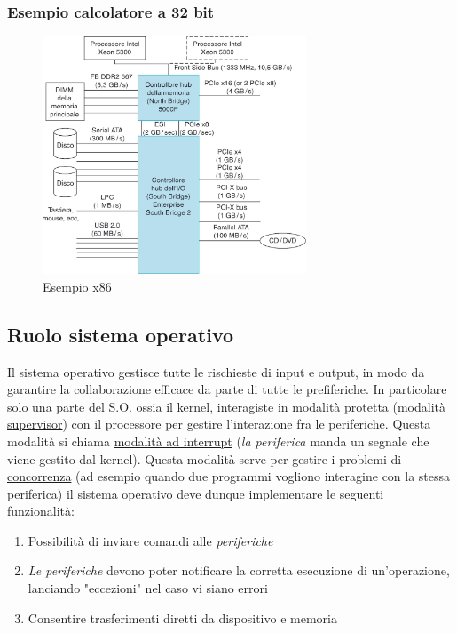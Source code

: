 \subsubsection*{Esempio calcolatore a 32 bit}
\begin{figure}[H]
	\begin{center}
		\includegraphics[width = 0.7\textwidth]{Images/Esempio x86.png }
	\end{center}
	\caption{Esempio x86}
\end{figure}
\subsection{Ruolo sistema operativo}
Il sistema operativo gestisce tutte le rischieste di input e output, in modo da garantire la collaborazione efficace da parte di tutte le prefiferiche. In particolare solo una parte del S.O. ossia il \underline{kernel}, interagiste in modalità protetta (\underline{modalità supervisor}) con il processore per gestire l'interazione fra le periferiche. Questa modalità si chiama \underline{modalità ad interrupt} (\textit{la periferica} manda un segnale che viene gestito dal kernel). Questa modalità serve per gestire i problemi di \underline{concorrenza} (ad esempio quando due programmi vogliono interagine con la stessa periferica)
\vskip3mm
il sistema operativo deve dunque implementare le seguenti funzionalità:
\begin{enumerate}
	\item Possibilità di inviare comandi alle \textit{periferiche}
	\item \textit{Le periferiche} devono poter notificare la corretta esecuzione di un'operazione, lanciando "eccezioni" nel caso vi siano errori
	\item Consentire trasferimenti diretti da dispositivo e memoria
\end{enumerate}
